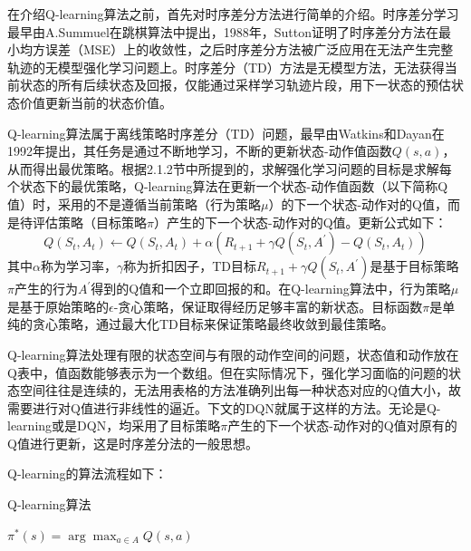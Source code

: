 在介绍Q-learning算法之前，首先对时序差分方法进行简单的介绍。时序差分学习最早由A.Summuel在跳棋算法中提出，1988年，Sutton证明了时序差分方法在最小均方误差（MSE）上的收敛性\cite{1998Reinforcement}，之后时序差分方法被广泛应用在无法产生完整轨迹的无模型强化学习问题上。时序差分（TD）方法是无模型方法，无法获得当前状态的所有后续状态及回报，仅能通过采样学习轨迹片段，用下一状态的预估状态价值更新当前的状态价值。

Q-learning算法属于离线策略时序差分（TD）问题，最早由Watkins和Dayan在1992年提出\cite{1992Technical}，其任务是通过不断地学习，不断的更新状态-动作值函数$Q(s,a)$，从而得出最优策略。根据2.1.2节中所提到的，求解强化学习问题的目标是求解每个状态下的最优策略，Q-learning算法在更新一个状态-动作值函数（以下简称Q值）时，采用的不是遵循当前策略（行为策略$\mu$）的下一个状态-动作对的Q值，而是待评估策略（目标策略$\pi$）产生的下一个状态-动作对的Q值。更新公式如下：
\begin{equation}\label{Q-learning}
    Q(S_t, A_t) \gets Q(S_t, A_t) + \alpha (R_{t+1}+\gamma Q(S_t, A^{'}) - Q(S_t, A_t))
\end{equation}
其中$\alpha$称为学习率，$\gamma$称为折扣因子，TD目标$R_{t+1}+\gamma Q(S_t, A^{'})$是基于目标策略$\pi$产生的行为$A^{'}$得到的Q值和一个立即回报的和。在Q-learning算法中，行为策略$\mu$是基于原始策略的$\epsilon$-贪心策略，保证取得经历足够丰富的新状态。目标函数$\pi$是单纯的贪心策略，通过最大化TD目标来保证策略最终收敛到最佳策略。

Q-learning算法处理有限的状态空间与有限的动作空间的问题，状态值和动作放在Q表中，值函数能够表示为一个数组。但在实际情况下，强化学习面临的问题的状态空间往往是连续的，无法用表格的方法准确列出每一种状态对应的Q值大小，故需要进行对Q值进行非线性的逼近。下文的DQN就属于这样的方法。无论是Q-learning或是DQN，均采用了目标策略$\pi$产生的下一个状态-动作对的Q值对原有的Q值进行更新，这是时序差分法的一般思想。

Q-learning的算法流程如下：

\begin{algorithm}[H]  
	\caption{Q-learning算法}%
    $\pi^{*}(s) = \arg \max_{a \in A} Q(s,a)$\;
\end{algorithm}

